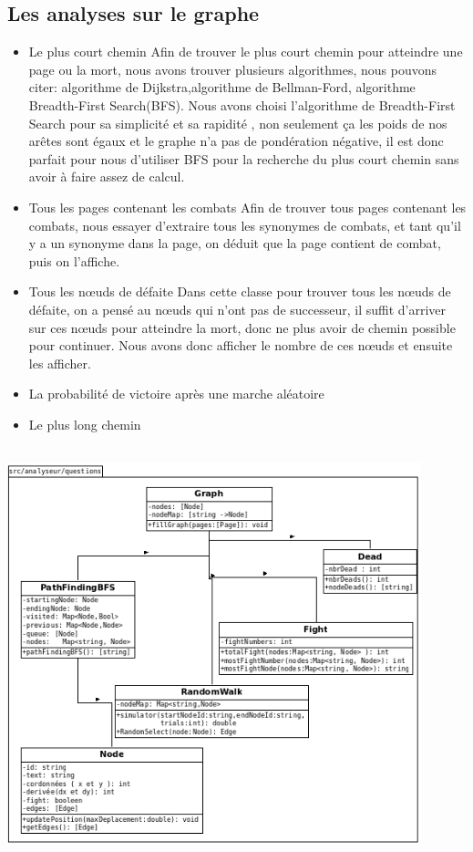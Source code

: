 \documentclass[12pt]{article}
\begin{document}
 \subsection{Les analyses sur le graphe}
   \begin{itemize}
   \item Le plus court chemin \newline
  Afin de trouver le plus court chemin pour atteindre une page ou la mort, nous avons trouver plusieurs algorithmes, nous pouvons citer: algorithme de Dijkstra,algorithme de Bellman-Ford, algorithme Breadth-First Search(BFS).
  Nous avons choisi l'algorithme de Breadth-First Search pour sa simplicité et sa rapidité , non seulement ça les poids de nos arêtes sont égaux et le graphe n'a pas de pondération négative, il est donc parfait pour nous d’utiliser BFS pour la recherche du plus court chemin sans avoir à faire assez de calcul.
 
   \item Tous les pages contenant les combats \newline
Afin de trouver tous pages contenant les combats, nous essayer d'extraire tous les synonymes de combats, et tant qu'il y a un synonyme dans la page, on déduit que la page contient de combat, puis on l'affiche.
   \item Tous les nœuds de défaite \newline
Dans cette classe pour trouver tous les nœuds de défaite, on a pensé au nœuds qui n'ont pas de successeur, il suffit d'arriver sur ces nœuds pour atteindre la mort, donc ne plus avoir de chemin possible pour continuer. Nous avons donc afficher le nombre de ces nœuds et ensuite les afficher.

 \item La  probabilité de victoire après une marche aléatoire \newline
 \item Le plus long chemin \newline
   
 
 \end{itemize}
 
 \includegraphics[width=12cm,height=12cm]{images/Diagramme1.png}
\end{document}
